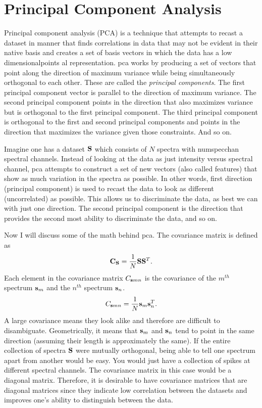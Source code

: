 \section{Principal Component Analysis}

Principal component analysis (PCA) is a technique that attempts to recast a dataset in manner that finds correlations in data that may not be evident in their native basis and creates a set of basis vectors in which the data has a low dimensionalpoints al representation. \Gls{pca} works by producing a set of vectors that point along the direction of maximum variance while being simultaneously orthogonal to each other. These are called the \emph{principal components}. The first principal component vector is parallel to the direction of maximum variance. The second principal component points in the direction that also maximizes variance but is orthogonal to the first principal component. The third principal component is orthogonal to the first and second principal components and points in the direction that maximizes the variance given those constraints. And so on. 

Imagine one has a dataset $\mathbf{S}$ which consists of $N$ spectra with \gls{numspecchan} spectral channels. Instead of looking at the data as just intensity versus spectral channel, \gls{pca} attempts to construct a set of new vectors (also called features) that show as much variation in the spectra as possible. In other words, first direction (principal component) is used to recast the data to look as different (uncorrelated) as possible. This allows us to discriminate the data, as best we can with just one direction. The second principal component is the direction that provides the second most ability to discriminate the data, and so on. 

Now I will discuss some of the math behind \gls{pca}. The covariance matrix is defined as
\begin{equation}
\mathbf{C_{\mathbf{S}}} = \frac{1}{N} \mathbf{S} \mathbf{S}^{T}.
\end{equation}
%
Each element in the covariance matrix $C_{\mathbf{s}mn}$ is the covariance of the $m^{th}$ spectrum $\mathbf{s}_m$ and the $n^{th}$ spectrum $\mathbf{s}_n$. 
%
\begin{equation}
C_{\mathbf{s}mn} = \frac{1}{N} \mathbf{s}_m \mathbf{s}_n^{T}.
\end{equation}
%
A large covariance means they look alike and therefore are difficult to disambiguate. Geometrically, it means that $\mathbf{s}_m$ and $\mathbf{s}_n$ tend to point in the same direction (assuming their length is approximately the same). If the entire collection of spectra $\mathbf{S}$ were mutually orthogonal, being able to tell one spectrum apart from another would be easy. You would just have a collection of spikes at different spectral channels. The covariance matrix in this case would be a diagonal matrix. Therefore, it is desirable to have covariance matrices that are diagonal matrices since they indicate low correlation between the datasets and improves one's ability to distinguish between the data.

